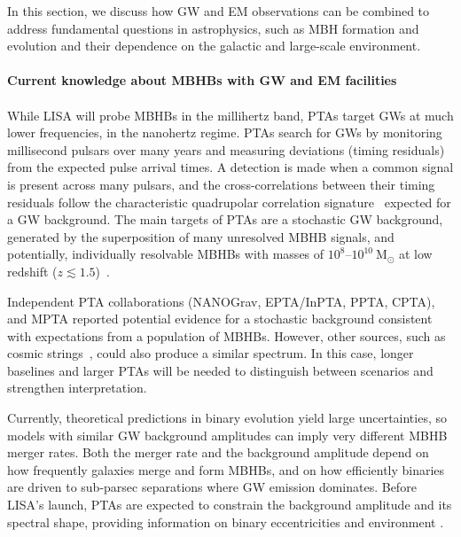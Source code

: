 \documentclass[a4paper,12pt]{article}
\begin{document}
In this section, we discuss how GW and EM observations can be combined to address fundamental questions in astrophysics, such as MBH formation and evolution and their dependence on the galactic and large-scale environment.

\paragraph{Current knowledge about MBHBs with GW and EM facilities}

\paragraph{}
While LISA will probe MBHBs in the millihertz band, PTAs target GWs at much lower frequencies, in the nanohertz regime. PTAs search for GWs by monitoring millisecond pulsars over many years and measuring deviations (timing residuals) from the expected pulse arrival times\cite{burke2019astrophysics}. A detection is made when a common signal is present across many pulsars, and the cross-correlations between their timing residuals follow the characteristic quadrupolar correlation signature~\cite{hellings1983upper} expected for a GW background. The main targets of PTAs are a stochastic GW background, generated by the superposition of many unresolved MBHB signals, and potentially, individually resolvable MBHBs with masses of $10^8$--$10^{10}~\mathrm{M}_{\odot}$ at low redshift ($z \lesssim 1.5$)~\cite{sesana2010measuring}. 

Independent PTA collaborations (NANOGrav\cite{arzoumanian2020nanograv}, EPTA/InPTA\cite{antoniadis2023second}, PPTA\cite{reardon2023search}, CPTA\cite{xu2023searching}), and MPTA\cite{miles2025meerkat} reported potential evidence for a stochastic background consistent with expectations from a population of MBHBs. However, other sources, such as cosmic strings~\cite{ellis2021cosmic}, could also produce a similar spectrum. In this case, longer baselines and larger PTAs will be needed to distinguish between scenarios and strengthen interpretation.

Currently, theoretical predictions in binary evolution yield large uncertainties, so models with similar GW background amplitudes can imply very different MBHB merger rates. Both the merger rate and the background amplitude depend on how frequently galaxies merge and form MBHBs, and on how efficiently binaries are driven to sub-parsec separations where GW emission dominates. Before LISA's launch, PTAs are expected to constrain the background amplitude and its spectral shape, providing information on binary eccentricities and environment \cite{sesana2009gravitational,kelley2017gravitational,taylor2019supermassive}.
\end{document}
